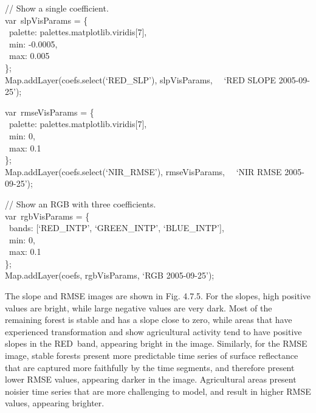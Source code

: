 \documentclass[
  letterpaper,
  DIV=11,
  numbers=noendperiod]{scrreprt}
\begin{document}
// Show a single coefficient.\\
var~slpVisParams = \{\\
\hspace*{0.333em} ~palette: palettes.matplotlib.viridis{[}7{]},\\
\hspace*{0.333em} ~min: -0.0005,\\
\hspace*{0.333em} ~max: 0.005\\
\};\\
Map.addLayer(coefs.select(`RED\_SLP'), slpVisParams,~ ~`RED SLOPE
2005-09-25');

var~rmseVisParams = \{\\
\hspace*{0.333em} ~palette: palettes.matplotlib.viridis{[}7{]},\\
\hspace*{0.333em} ~min: 0,\\
\hspace*{0.333em} ~max: 0.1\\
\};\\
Map.addLayer(coefs.select(`NIR\_RMSE'), rmseVisParams,~ ~`NIR RMSE
2005-09-25');

// Show an RGB with three coefficients.\\
var~rgbVisParams = \{\\
\hspace*{0.333em} ~bands: {[}`RED\_INTP', `GREEN\_INTP',
`BLUE\_INTP'{]},\\
\hspace*{0.333em} ~min: 0,\\
\hspace*{0.333em} ~max: 0.1\\
\};\\
Map.addLayer(coefs, rgbVisParams, `RGB 2005-09-25');

The slope and RMSE images are shown in Fig. 4.7.5. For the slopes, high
positive values are bright, while large negative values are very dark.
Most of the remaining forest is stable and has a slope close to zero,
while areas that have experienced transformation and show agricultural
activity tend to have positive slopes in the RED~band, appearing bright
in the image. Similarly, for the RMSE image, stable forests present more
predictable time series of surface reflectance that are captured more
faithfully by the time segments, and therefore present lower RMSE
values, appearing darker in the image. Agricultural areas present
noisier time series that are more challenging to model, and result in
higher RMSE values, appearing brighter.
\end{document}
